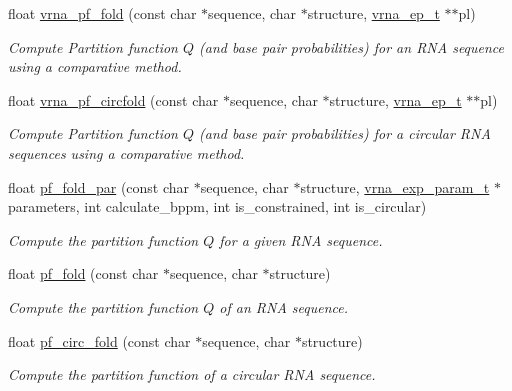 \begin{DoxyCompactItemize}
float \mbox{\hyperlink{group__pf__fold_gac4a2a74a79e49818bc35412a2b392c7e}{vrna\+\_\+pf\+\_\+fold}} (const char $\ast$sequence, char $\ast$structure, \mbox{\hyperlink{group__struct__utils_gab9ac98ab55ded9fb90043b024b915aca}{vrna\+\_\+ep\+\_\+t}} $\ast$$\ast$pl)
\begin{DoxyCompactList}\small\item\em Compute Partition function $Q$ (and base pair probabilities) for an R\+NA sequence using a comparative method. \end{DoxyCompactList}\item 
float \mbox{\hyperlink{group__pf__fold_ga87e5a77b6e50dd54e9d032a9b92973be}{vrna\+\_\+pf\+\_\+circfold}} (const char $\ast$sequence, char $\ast$structure, \mbox{\hyperlink{group__struct__utils_gab9ac98ab55ded9fb90043b024b915aca}{vrna\+\_\+ep\+\_\+t}} $\ast$$\ast$pl)
\begin{DoxyCompactList}\small\item\em Compute Partition function $Q$ (and base pair probabilities) for a circular R\+NA sequences using a comparative method. \end{DoxyCompactList}\item 
float \mbox{\hyperlink{group__pf__fold_gac4f95bee734b2563a3d6e9932117ebdf}{pf\+\_\+fold\+\_\+par}} (const char $\ast$sequence, char $\ast$structure, \mbox{\hyperlink{group__energy__parameters_ga01d8b92fe734df8d79a6169482c7d8d8}{vrna\+\_\+exp\+\_\+param\+\_\+t}} $\ast$parameters, int calculate\+\_\+bppm, int is\+\_\+constrained, int is\+\_\+circular)
\begin{DoxyCompactList}\small\item\em Compute the partition function $Q$ for a given R\+NA sequence. \end{DoxyCompactList}\item 
float \mbox{\hyperlink{group__pf__fold_gadc3db3d98742427e7001a7fd36ef28c2}{pf\+\_\+fold}} (const char $\ast$sequence, char $\ast$structure)
\begin{DoxyCompactList}\small\item\em Compute the partition function $Q$ of an R\+NA sequence. \end{DoxyCompactList}\item 
float \mbox{\hyperlink{group__pf__fold_ga819ce5fca8984004ac81c4a3b04cb735}{pf\+\_\+circ\+\_\+fold}} (const char $\ast$sequence, char $\ast$structure)
\begin{DoxyCompactList}\small\item\em Compute the partition function of a circular R\+NA sequence. \end{DoxyCompactList}\item 

\end{DoxyCompactItemize}
